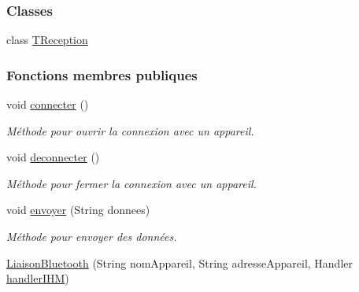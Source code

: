 \subsubsection*{Classes}
\begin{DoxyCompactItemize}
\item 
class \hyperlink{classcom_1_1example_1_1area_1_1_liaison_bluetooth_1_1_t_reception}{T\+Reception}
\end{DoxyCompactItemize}
\subsubsection*{Fonctions membres publiques}
\begin{DoxyCompactItemize}
\item 
void \hyperlink{classcom_1_1example_1_1area_1_1_liaison_bluetooth_a7b9662a4224762b23c814d1f4539002a}{connecter} ()
\begin{DoxyCompactList}\small\item\em Méthode pour ouvrir la connexion avec un appareil. \end{DoxyCompactList}\item 
void \hyperlink{classcom_1_1example_1_1area_1_1_liaison_bluetooth_a10b356586feed95ecacb0a57cb51f0e6}{deconnecter} ()
\begin{DoxyCompactList}\small\item\em Méthode pour fermer la connexion avec un appareil. \end{DoxyCompactList}\item 
void \hyperlink{classcom_1_1example_1_1area_1_1_liaison_bluetooth_a67360b2f673b47b8a552a9e789a93fce}{envoyer} (String donnees)
\begin{DoxyCompactList}\small\item\em Méthode pour envoyer des données. \end{DoxyCompactList}\item 
\hyperlink{classcom_1_1example_1_1area_1_1_liaison_bluetooth_a1388dcaf09e2493d2fac6ddb9d8d58e1}{Liaison\+Bluetooth} (String nom\+Appareil, String adresse\+Appareil, Handler \hyperlink{classcom_1_1example_1_1area_1_1_liaison_bluetooth_ace2c20759fc96d3ae787f1f726fd2691}{handler\+I\+HM})
\end{DoxyCompactItemize}
